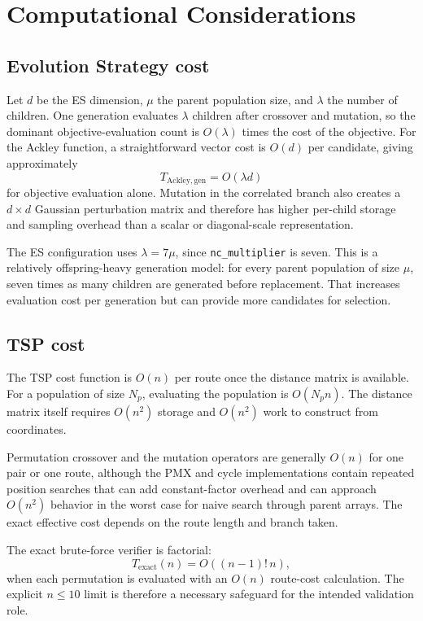 \documentclass[11pt,a4paper]{article}
\newcommand{\code}[1]{\texttt{#1}}
\begin{document}
\section{Computational Considerations}
\subsection{Evolution Strategy cost}
Let $d$ be the ES dimension, $\mu$ the parent population size, and $\lambda$ the number of children. One generation evaluates $\lambda$ children after crossover and mutation, so the dominant objective-evaluation count is $O(\lambda)$ times the cost of the objective. For the Ackley function, a straightforward vector cost is $O(d)$ per candidate, giving approximately
\begin{equation}
T_{\mathrm{Ackley,gen}}=O(\lambda d)
\end{equation}
for objective evaluation alone. Mutation in the correlated branch also creates a $d\times d$ Gaussian perturbation matrix and therefore has higher per-child storage and sampling overhead than a scalar or diagonal-scale representation.

The ES configuration uses $\lambda=7\mu$, since \code{nc\_multiplier} is seven. This is a relatively offspring-heavy generation model: for every parent population of size $\mu$, seven times as many children are generated before replacement. That increases evaluation cost per generation but can provide more candidates for selection.

\subsection{TSP cost}
The TSP cost function is $O(n)$ per route once the distance matrix is available. For a population of size $N_p$, evaluating the population is $O(N_p n)$. The distance matrix itself requires $O(n^2)$ storage and $O(n^2)$ work to construct from coordinates.

Permutation crossover and the mutation operators are generally $O(n)$ for one pair or one route, although the PMX and cycle implementations contain repeated position searches that can add constant-factor overhead and can approach $O(n^2)$ behavior in the worst case for naive search through parent arrays. The exact effective cost depends on the route length and branch taken.

The exact brute-force verifier is factorial:
\begin{equation}
T_{\mathrm{exact}}(n)=O((n-1)!\,n),
\end{equation}
when each permutation is evaluated with an $O(n)$ route-cost calculation. The explicit $n\leq 10$ limit is therefore a necessary safeguard for the intended validation role.
\end{document}
